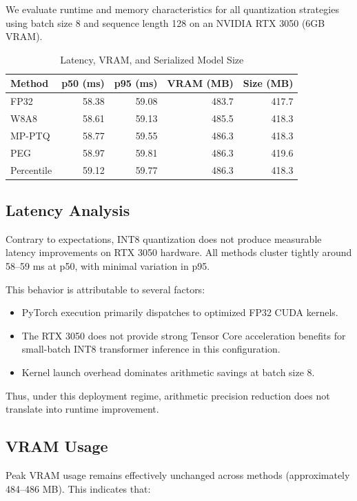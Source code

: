 \documentclass[conference]{IEEEtran}
\begin{document}
We evaluate runtime and memory characteristics for all quantization strategies using batch size 8 and sequence length 128 on an NVIDIA RTX 3050 (6GB VRAM).

\begin{table}[t]
\centering
\caption{Latency, VRAM, and Serialized Model Size}
\label{tab:deploy}
\begin{tabular}{lrrrr}
\toprule
Method & p50 (ms) & p95 (ms) & VRAM (MB) & Size (MB) \\
\midrule
FP32 & 58.38 & 59.08 & 483.7 & 417.7 \\
W8A8 & 58.61 & 59.13 & 485.5 & 418.3 \\
MP-PTQ & 58.77 & 59.55 & 486.3 & 418.3 \\
PEG & 58.97 & 59.81 & 486.3 & 419.6 \\
Percentile & 59.12 & 59.77 & 486.3 & 418.3 \\
\bottomrule
\end{tabular}
\end{table}

\subsection{Latency Analysis}

Contrary to expectations, INT8 quantization does not produce measurable latency improvements on RTX 3050 hardware. All methods cluster tightly around 58–59 ms at p50, with minimal variation in p95.

This behavior is attributable to several factors:

\begin{itemize}
\item PyTorch execution primarily dispatches to optimized FP32 CUDA kernels.
\item The RTX 3050 does not provide strong Tensor Core acceleration benefits for small-batch INT8 transformer inference in this configuration.
\item Kernel launch overhead dominates arithmetic savings at batch size 8.
\end{itemize}

Thus, under this deployment regime, arithmetic precision reduction does not translate into runtime improvement.

\subsection{VRAM Usage}

Peak VRAM usage remains effectively unchanged across methods (approximately 484–486 MB). This indicates that:
\end{document}
